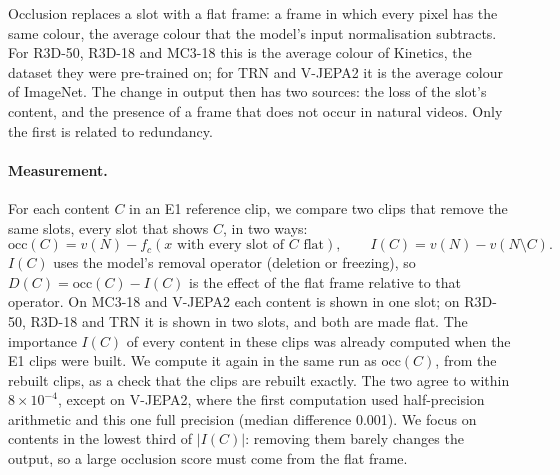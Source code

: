 Occlusion replaces a slot with a flat frame: a frame in which every pixel has the same colour, the average colour that the model's input normalisation subtracts.
For R3D-50, R3D-18 and MC3-18 this is the average colour of Kinetics, the dataset they were pre-trained on; for TRN and V-JEPA2 it is the average colour of ImageNet.
The change in output then has two sources: the loss of the slot's content, and the presence of a frame that does not occur in natural videos.
Only the first is related to redundancy.

\paragraph{Measurement.}
For each content $C$ in an E1 reference clip, we compare two clips that remove the same slots, every slot that shows $C$, in two ways:
\begin{equation}
  \mathrm{occ}(C) = v(N) - f_c(x \text{ with every slot of } C \text{ flat}), \qquad
  I(C) = v(N) - v(N \setminus C).
\end{equation}
$I(C)$ uses the model's removal operator (deletion or freezing), so $D(C) = \mathrm{occ}(C) - I(C)$ is the effect of the flat frame relative to that operator.
On MC3-18 and V-JEPA2 each content is shown in one slot; on R3D-50, R3D-18 and TRN it is shown in two slots, and both are made flat.
The importance $I(C)$ of every content in these clips was already computed when the E1 clips were built.
We compute it again in the same run as $\mathrm{occ}(C)$, from the rebuilt clips, as a check that the clips are rebuilt exactly.
The two agree to within $8 \times 10^{-4}$, except on V-JEPA2, where the first computation used half-precision arithmetic and this one full precision (median difference 0.001).
We focus on contents in the lowest third of $|I(C)|$: removing them barely changes the output, so a large occlusion score must come from the flat frame.

